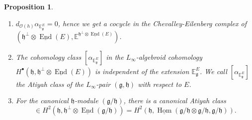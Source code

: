 \documentclass[12pt]{amsart}
\newtheorem{prop}[thm]{Proposition}
\theoremstyle{definition}
\theoremstyle{remark}
\numberwithin{equation}{section}
\newcommand{\CO}{{\mathcal O}}
\newcommand{\1}{{\mathbb{1}}}
\newcommand{\g}{\mathfrak{g}}
\newcommand{\h}{\mathfrak{h}}
\newcommand{\Hom}{\operatorname{Hom}}
\newcommand{\End}{\operatorname{End}}
\begin{document}
\begin{prop}
\begin{enumerate}
    \item $d_{\CO(h)}\alpha_{\mathbb{E}_{\g}^E} = 0$, hence we get a cocycle in the Chevalley-Eilenberg complex of $(\h^{\perp}\otimes \underline{\End}(E), \mathbb{E}^{\h^{\perp}\otimes \underline{\End}(E)})$.
    \item The cohomology class $[\alpha_{\mathbb{E}_{\g}^E}]$ in the 
    $L_{\infty}$-algebroid cohomology $H^{\bullet}(\h, \h^{\perp}\otimes \underline{\End}(E))$ is independent of the extension $\mathbb{E}_{\g}^E$. We call $[\alpha_{\mathbb{E}_{\g}^E}]$ the {\it Atiyah class} of the $L_{\infty}$-pair $(\g, \h)$ with respect to $E$. 
    \item For the canonical $\h$-module $(\g/\h)$, there is a canonical Atiyah class
    \begin{equation*}
        [\alpha^{\g/\h}] \in H^2(\h, \h^{\perp}\otimes \underline{\End}(\g/\h)) = H^2(\h,  \underline{\Hom}(\g/\h \otimes \g/\h, \g/\h)).
    \end{equation*}
\end{enumerate}
\end{prop}
\end{document}
